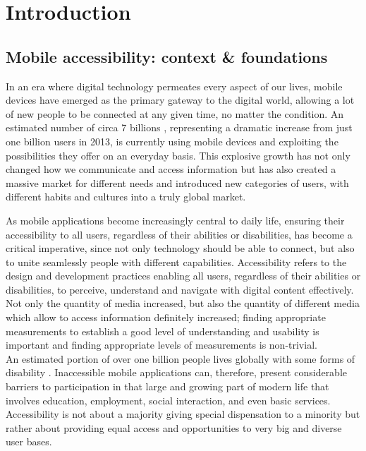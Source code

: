 \chapter{Introduction}
\label{chap:intro}

\section{Mobile accessibility: context \& foundations}
\label{chap:intro-background}

In an era where digital technology permeates every aspect of our lives, mobile devices have emerged as the primary gateway to the digital world, allowing a lot of new people to be connected at any given time, no matter the condition. An estimated number of circa 7 billions \cite{article:number-of-users}, representing a dramatic increase from just one billion users in 2013, is currently using mobile devices and exploiting the possibilities they offer on an everyday basis. This explosive growth has not only changed how we communicate and access information but has also created a massive market for different needs and introduced new categories of users, with different habits and cultures into a truly global market.

As mobile applications become increasingly central to daily life, ensuring their accessibility to all users, regardless of their abilities or disabilities, has become a critical imperative, since not only technology should be able to connect, but also to unite seamlessly people with different capabilities. Accessibility refers to the design and development practices enabling all users, regardless of their abilities or disabilities, to perceive, understand and navigate with digital content effectively. Not only the quantity of media increased, but also the quantity of different media which allow to access information definitely increased; finding appropriate measurements to establish a good level of understanding and usability is important and finding appropriate levels of measurements is non-trivial. \\

An estimated portion of over one billion people lives globally with some forms of disability \cite{article:who-disability}. Inaccessible mobile applications can, therefore, present considerable barriers to participation in that large and growing part of modern life that involves education, employment, social interaction, and even basic services. Accessibility is not about a majority giving special dispensation to a minority but rather about providing equal access and opportunities to very big and diverse user bases.

